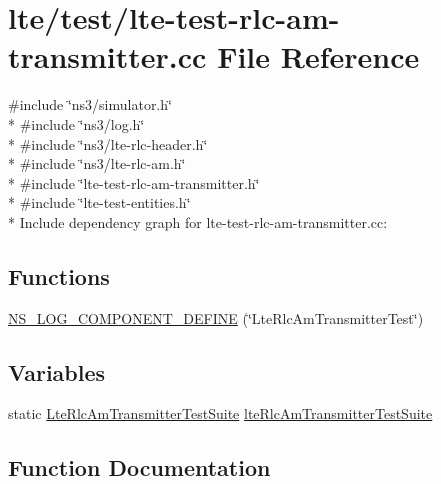 \hypertarget{lte-test-rlc-am-transmitter_8cc}{}\section{lte/test/lte-\/test-\/rlc-\/am-\/transmitter.cc File Reference}
\label{lte-test-rlc-am-transmitter_8cc}
{\ttfamily \#include \char`\"{}ns3/simulator.\+h\char`\"{}}\\*
{\ttfamily \#include \char`\"{}ns3/log.\+h\char`\"{}}\\*
{\ttfamily \#include \char`\"{}ns3/lte-\/rlc-\/header.\+h\char`\"{}}\\*
{\ttfamily \#include \char`\"{}ns3/lte-\/rlc-\/am.\+h\char`\"{}}\\*
{\ttfamily \#include \char`\"{}lte-\/test-\/rlc-\/am-\/transmitter.\+h\char`\"{}}\\*
{\ttfamily \#include \char`\"{}lte-\/test-\/entities.\+h\char`\"{}}\\*
Include dependency graph for lte-\/test-\/rlc-\/am-\/transmitter.cc\+:
\subsection*{Functions}
\begin{DoxyCompactItemize}
\item 
\hyperlink{lte-test-rlc-am-transmitter_8cc_af57911423fe4821de4f7f3c3c6a404e2}{N\+S\+\_\+\+L\+O\+G\+\_\+\+C\+O\+M\+P\+O\+N\+E\+N\+T\+\_\+\+D\+E\+F\+I\+NE} (\char`\"{}Lte\+Rlc\+Am\+Transmitter\+Test\char`\"{})
\end{DoxyCompactItemize}
\subsection*{Variables}
\begin{DoxyCompactItemize}
\item 
static \hyperlink{classLteRlcAmTransmitterTestSuite}{Lte\+Rlc\+Am\+Transmitter\+Test\+Suite} \hyperlink{lte-test-rlc-am-transmitter_8cc_a1e65aab641dfae8de74a056b0833dfbc}{lte\+Rlc\+Am\+Transmitter\+Test\+Suite}
\end{DoxyCompactItemize}


\subsection{Function Documentation}
